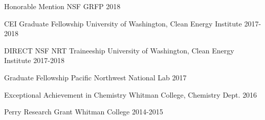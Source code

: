 



\begin{cvhonors}


\cvhonor
{Honorable Mention}%
{NSF GRFP} %
{} %
{2018} %


\cvhonor
{CEI Graduate Fellowship}%
{University of Washington, Clean Energy Institute} %
{} %
{2017-2018} %


\cvhonor
{DIRECT NSF NRT Traineeship}%
{University of Washington, Clean Energy Institute} %
{} %
{2017-2018} %


\cvhonor
{Graduate Fellowship} %
{Pacific Northwest National Lab}%
{} %
{2017} %


\cvhonor
{Exceptional Achievement in Chemistry}%
{Whitman College, Chemistry Dept.} %
{} %
{2016} %


\cvhonor
{Perry Research Grant} %
{Whitman College} %
{} %
{2014-2015} %


\end{cvhonors}
\vspace{-1cm}
